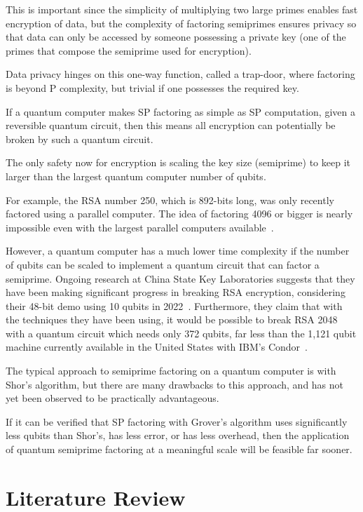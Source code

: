 \documentclass[twocolumn]{cinc}
\begin{document}
  This is important since the simplicity of multiplying two large primes enables fast encryption of data, 
  but the complexity of factoring semiprimes ensures privacy so that data can only be accessed by someone possessing a private key 
  (one of the primes that compose the semiprime used for encryption).

  Data privacy hinges on this one-way function, called a trap-door, where factoring 
  is beyond P complexity, but trivial if one possesses the required key. 

  If a quantum computer makes SP factoring as simple as SP computation, given a 
  reversible quantum circuit, then this means all encryption can potentially 
  be broken by such a quantum circuit. 

  The only safety now for encryption is scaling the key size (semiprime) to keep 
  it larger than the largest quantum computer number of qubits.

  For example, the RSA number 250, which is 892-bits long, was only recently factored using a parallel computer. 
  The idea of factoring 4096 or bigger is nearly impossible even with the largest parallel computers available~\cite{FergusonSchneier2003}. 

  However, a quantum computer has a much lower time complexity if the number of qubits
  can be scaled to implement a quantum circuit that can factor a semiprime. Ongoing research
  at China State Key Laboratories suggests that they have been making significant
  progress in breaking RSA encryption, considering their 48-bit demo using 10 qubits
  in 2022~\cite{yan2022factoringintegerssublinearresources}. Furthermore, they claim
  that with the techniques they have been using, it would be possible to break
  RSA 2048 with a quantum circuit which needs only 372 qubits, far less than the
  1,121 qubit machine currently available in the United 
  States with IBM's Condor~\cite{abughanem2024ibmquantumcomputersevolution}.

  The typical approach to semiprime factoring on a quantum computer is 
  with Shor's algorithm, but there are many drawbacks to this approach,
  and has not yet been observed to be practically advantageous.

  If it can be verified that SP factoring with Grover's algorithm
  uses significantly less qubits than Shor's, has less error, or has less overhead,
  then the application of quantum semiprime factoring at a meaningful scale 
  will be feasible far sooner.

\section{Literature Review}
\end{document}
